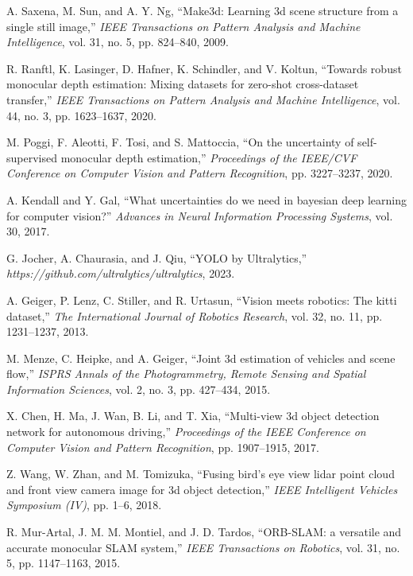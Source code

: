 \documentclass[10pt]{article}
\begin{document}
\begin{thebibliography}{99}

A. Saxena, M. Sun, and A. Y. Ng,
``Make3d: Learning 3d scene structure from a single still image,''
\emph{IEEE Transactions on Pattern Analysis and Machine Intelligence}, vol. 31, no. 5, pp. 824--840, 2009.

R. Ranftl, K. Lasinger, D. Hafner, K. Schindler, and V. Koltun,
``Towards robust monocular depth estimation: Mixing datasets for zero-shot cross-dataset transfer,''
\emph{IEEE Transactions on Pattern Analysis and Machine Intelligence}, vol. 44, no. 3, pp. 1623--1637, 2020.

M. Poggi, F. Aleotti, F. Tosi, and S. Mattoccia,
``On the uncertainty of self-supervised monocular depth estimation,''
\emph{Proceedings of the IEEE/CVF Conference on Computer Vision and Pattern Recognition}, pp. 3227--3237, 2020.

A. Kendall and Y. Gal,
``What uncertainties do we need in bayesian deep learning for computer vision?''
\emph{Advances in Neural Information Processing Systems}, vol. 30, 2017.

G. Jocher, A. Chaurasia, and J. Qiu,
``YOLO by Ultralytics,''
\emph{https://github.com/ultralytics/ultralytics}, 2023.

A. Geiger, P. Lenz, C. Stiller, and R. Urtasun,
``Vision meets robotics: The kitti dataset,''
\emph{The International Journal of Robotics Research}, vol. 32, no. 11, pp. 1231--1237, 2013.

M. Menze, C. Heipke, and A. Geiger,
``Joint 3d estimation of vehicles and scene flow,''
\emph{ISPRS Annals of the Photogrammetry, Remote Sensing and Spatial Information Sciences}, vol. 2, no. 3, pp. 427--434, 2015.

X. Chen, H. Ma, J. Wan, B. Li, and T. Xia,
``Multi-view 3d object detection network for autonomous driving,''
\emph{Proceedings of the IEEE Conference on Computer Vision and Pattern Recognition}, pp. 1907--1915, 2017.

Z. Wang, W. Zhan, and M. Tomizuka,
``Fusing bird's eye view lidar point cloud and front view camera image for 3d object detection,''
\emph{IEEE Intelligent Vehicles Symposium (IV)}, pp. 1--6, 2018.

R. Mur-Artal, J. M. M. Montiel, and J. D. Tardos,
``ORB-SLAM: a versatile and accurate monocular SLAM system,''
\emph{IEEE Transactions on Robotics}, vol. 31, no. 5, pp. 1147--1163, 2015.


\end{thebibliography}
\end{document}
